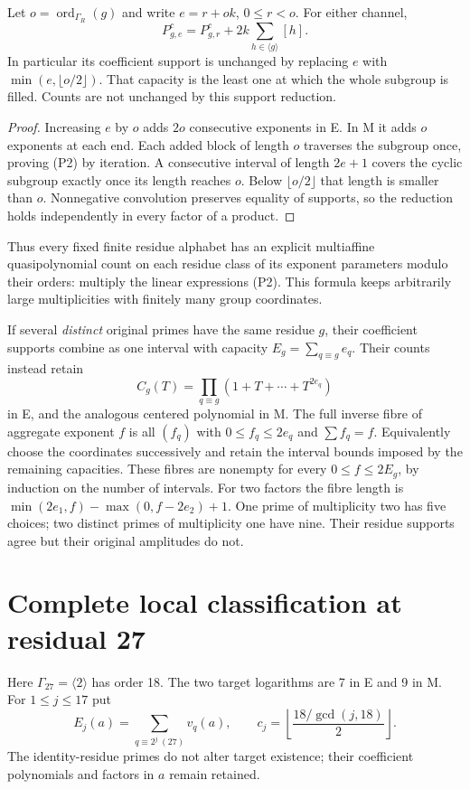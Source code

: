 \begin{theorem}
Let $o=\operatorname{ord}_{\Gamma_R}(g)$ and write $e=r+ok$, $0\le r<o$.
For either channel,
\[
 \boxed{P^c_{g,e}=P^c_{g,r}+2k\sum_{h\in\langle g\rangle}[h].}
 \tag{P2}
\]
In particular its coefficient support is unchanged by replacing $e$ with
$\min(e,\lfloor o/2\rfloor)$. That capacity is the least one at which the
whole subgroup is filled. Counts are not unchanged by this support reduction.
\end{theorem}
\begin{proof}
Increasing $e$ by $o$ adds $2o$ consecutive exponents in E. In M it adds
$o$ exponents at each end. Each added block of length $o$ traverses the
subgroup once, proving (P2) by iteration. A consecutive interval of length
$2e+1$ covers the cyclic subgroup exactly once its length reaches $o$.
Below $\lfloor o/2\rfloor$ that length is smaller than $o$. Nonnegative
convolution preserves equality of supports, so the reduction holds independently
in every factor of a product.
\end{proof}
Thus every fixed finite residue alphabet has an explicit multiaffine
quasipolynomial count on each residue class of its exponent parameters modulo
their orders: multiply the linear expressions (P2). This formula keeps arbitrarily
large multiplicities with finitely many group coordinates.

If several \emph{distinct} original primes have the same residue $g$, their
coefficient supports combine as one interval with capacity
$E_g=\sum_{q\equiv g}e_q$. Their counts instead retain
\[
 C_g(T)=\prod_{q\equiv g}(1+T+\cdots+T^{2e_q})
 \tag{P3}
\]
in E, and the analogous centered polynomial in M. The full inverse fibre of
aggregate exponent $f$ is all $(f_q)$ with $0\le f_q\le2e_q$ and
$\sum f_q=f$. Equivalently choose the coordinates successively and retain the
interval bounds imposed by the remaining capacities. These fibres are nonempty
for every $0\le f\le2E_g$, by induction on the number of intervals.
For two factors the fibre length is
$\min(2e_1,f)-\max(0,f-2e_2)+1$. One prime of multiplicity two has five choices;
two distinct primes of multiplicity one have nine. Their residue supports agree
but their original amplitudes do not.

\section{Complete local classification at residual 27}
Here $\Gamma_{27}=\langle2\rangle$ has order 18. The two target logarithms
are 7 in E and 9 in M. For $1\le j\le17$ put
\[
 E_j(a)=\sum_{q\equiv2^j\ (27)}v_q(a),\qquad
 c_j=\left\lfloor\frac{18/\gcd(j,18)}2\right\rfloor.
 \tag{C1}
\]
The identity-residue primes do not alter target existence; their coefficient
polynomials and factors in $a$ remain retained.

